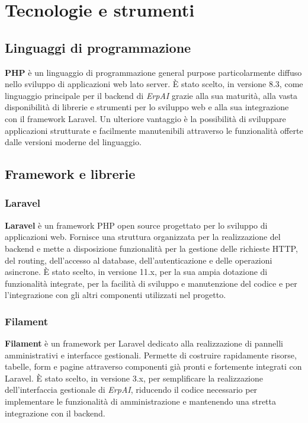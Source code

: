 \chapter{Tecnologie e strumenti}
\label{chap:tecnologie}


\section{Linguaggi di programmazione}
\textbf{PHP} è un linguaggio di programmazione general purpose particolarmente diffuso nello sviluppo di applicazioni web lato server. È stato scelto, in versione 8.3, come linguaggio 
principale per il backend di \textit{ErpAI} grazie alla sua maturità, alla vasta disponibilità di librerie e strumenti per lo sviluppo web e alla sua integrazione con il framework 
Laravel. Un ulteriore vantaggio è la possibilità di sviluppare applicazioni strutturate e facilmente manutenibili attraverso le funzionalità offerte dalle versioni moderne 
del linguaggio.


\section{Framework e librerie}
\subsection{Laravel}
\textbf{Laravel} è un framework PHP open source progettato per lo sviluppo di applicazioni web. Fornisce una struttura organizzata per la realizzazione del backend e 
mette a disposizione funzionalità per la gestione delle richieste HTTP, del routing, dell'accesso al database, dell'autenticazione e delle operazioni asincrone. 
È stato scelto, in versione 11.x, per la sua ampia dotazione di funzionalità integrate, per la facilità di sviluppo e manutenzione del codice e per l'integrazione con gli altri componenti 
utilizzati nel progetto.

\subsection{Filament}
\textbf{Filament} è un framework per Laravel dedicato alla realizzazione di pannelli amministrativi e interfacce gestionali. Permette di costruire rapidamente risorse, tabelle, 
form e pagine attraverso componenti già pronti e fortemente integrati con Laravel. È stato scelto, in versione 3.x, per semplificare la realizzazione dell'interfaccia gestionale di \textit{ErpAI}, 
riducendo il codice necessario per implementare le funzionalità di amministrazione e mantenendo una stretta integrazione con il backend.

